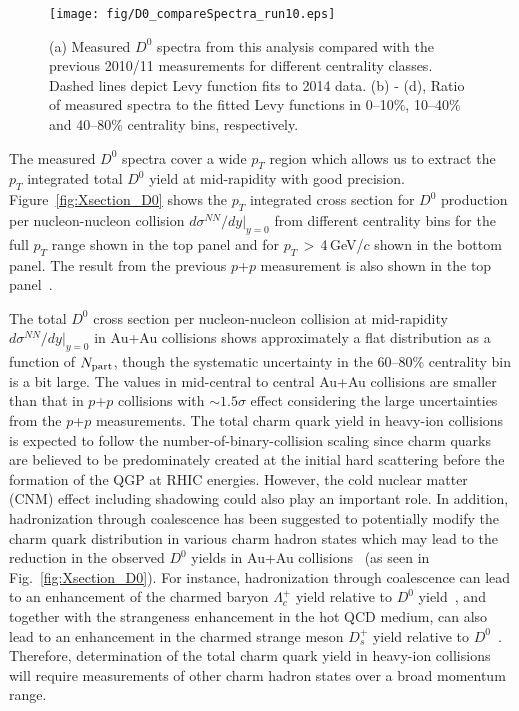 \documentclass[%
 reprint,	
 amsmath,amssymb,
 aps,
 prc,
]{revtex4-1}
\begin{document}
\begin{figure}
\centering
\texttt{[image: fig/D0\_compareSpectra\_run10.eps]}
  \caption{(a) Measured $D^{0}$ spectra from this analysis compared with the previous 2010/11 measurements for different centrality classes. Dashed lines depict Levy function fits to 2014 data. (b) - (d), Ratio of measured spectra to the fitted Levy functions in 0--10\%, 10--40\% and 40--80\% centrality bins, respectively.}
\label{fig:D0_compareSpectra_run10} 
\end{figure}


The measured $D^0$ spectra cover a wide $p_{T}$ region which allows us to extract the $p_{T}$ integrated total $D^0$ yield at mid-rapidity with good precision. Figure~\ref{fig:Xsection_D0} shows the $p_{T}$ integrated cross section for $D^0$ production per nucleon-nucleon collision $d\sigma^{NN}/dy|_{y=0}$ from different centrality bins for the full $p_{T}$ range shown in the top panel and for $p_{T}$\,$>$\,4\,GeV/$c$ shown in the bottom panel. The result from the previous $p$+$p$ measurement is also shown in the top panel~\cite{Star_D_pp}.

The total $D^0$ cross section per nucleon-nucleon collision at mid-rapidity $d\sigma^{NN}/dy|_{y=0}$ in Au+Au collisions shows approximately a flat distribution as a function of $N_{\rm part}$, though the systematic uncertainty in the 60--80\% centrality bin is a bit large. The values in mid-central to central Au+Au collisions are smaller than that in $p$+$p$ collisions with $\sim1.5\sigma$ effect considering the large uncertainties from the $p$+$p$ measurements. The total charm quark yield in heavy-ion collisions is expected to follow the number-of-binary-collision scaling since charm quarks are believed to be predominately created at the initial hard scattering before the formation of the QGP at RHIC energies. However, the cold nuclear matter (CNM) effect including shadowing could also play an important role. In addition, hadronization through coalescence has been suggested to potentially modify the charm quark distribution in various charm hadron states which may lead to the reduction in the observed $D^0$ yields in Au+Au collisions~\cite{GRECO2004202} (as seen in Fig.~\ref{fig:Xsection_D0}). For instance, hadronization through coalescence can lead to an enhancement of the charmed baryon $\Lambda_{c}^+$ yield relative to $D^0$ yield~\cite{Oh2009,Zhao:2018jlw,Plumari:2017ntm}, and together with the strangeness enhancement in the hot QCD medium, can also lead to an enhancement in the charmed strange meson $D_{s}^+$ yield relative to $D^0$~\cite{He2013,Zhao:2018jlw,Plumari:2017ntm}. Therefore, determination of the total charm quark yield in heavy-ion collisions will require measurements of other charm hadron states over a broad momentum range.
\end{document}
